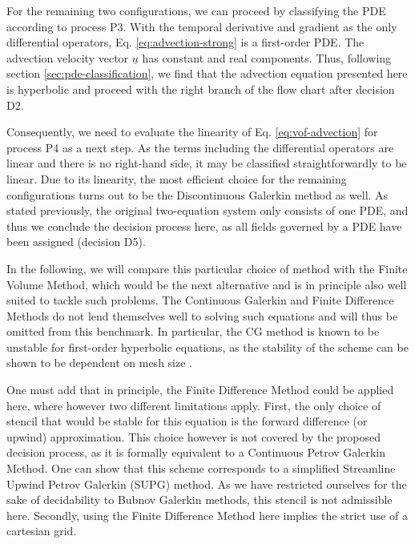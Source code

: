 \documentclass[asi,article,submit,moreauthors]{Definitions/mdpi}
\begin{document}
For the remaining two configurations, we can proceed by classifying the PDE according to process P3.
With the temporal derivative and gradient as the only differential operators, Eq. \ref{eq:advection-strong} is a first-order PDE.
The advection velocity vector $\underline{u}$ has constant and real components.
Thus, following section \ref{sec:pde-classification}, we find that the advection equation presented here is hyperbolic and proceed with the right branch of the flow chart after decision D2.

Consequently, we need to evaluate the linearity of Eq. \ref{eq:vof-advection} for process P4 as a next step.
As the terms including the differential operators are linear and there is no right-hand side, it may be classified straightforwardly to be linear.
Due to its linearity, the most efficient choice for the remaining configurations turns out to be the Discontinuous Galerkin method as well.
As stated previously, the original two-equation system only consists of one PDE, and thus we conclude the decision process here, as all fields governed by a PDE have been assigned (decision D5).

In the following, we will compare this particular choice of method with the Finite Volume Method, which would be the next alternative and is in principle also well suited to tackle such problems.
The Continuous Galerkin and Finite Difference Methods do not lend themselves well to solving such equations and will thus be omitted from this benchmark.
In particular, the CG method is known to be unstable for first-order hyperbolic equations, as the stability of the scheme can be shown to be dependent on mesh size \cite{ernTheoryPracticeFinite2004}.

One must add that in principle, the Finite Difference Method could be applied here, where however two different limitations apply.
First, the only choice of stencil that would be stable for this equation is the forward difference (or upwind) approximation.
This choice however is not covered by the proposed decision process, as it is formally equivalent to a Continuous Petrov Galerkin Method.
One can show that this scheme corresponds to a simplified Streamline Upwind Petrov Galerkin (SUPG) method. As we have restricted ourselves for the sake of decidability to Bubnov Galerkin methods, this stencil is not admissible here.
Secondly, using the Finite Difference Method here implies the strict use of a cartesian grid.
\end{document}

